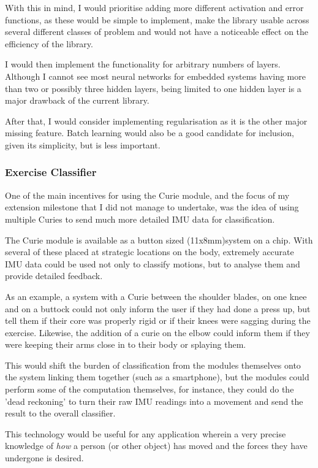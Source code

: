 \documentclass[a4paper]{article}
\begin{document}
With this in mind, I would prioritise adding more different activation and error functions, as these would be simple to implement, make the library usable across several different classes of problem and would not have a noticeable effect on the efficiency of the library.

I would then implement the functionality for arbitrary numbers of layers. Although I cannot see most neural networks for embedded systems having more than two or possibly three hidden layers, being limited to one hidden layer is a major drawback of the current library. 

After that, I would consider implementing regularisation as it is the other major missing feature. Batch learning would also be a good candidate for inclusion, given its simplicity, but is less important.

\subsubsection{Exercise Classifier}

One of the main incentives for using the Curie module, and the focus of my extension milestone that I did not manage to undertake, was the idea of using multiple Curies to send much more detailed IMU data for classification.

The Curie module is available as a button sized (11x8mm)system on a chip.\cite{fwref2} With several of these placed at strategic locations on the body, extremely accurate IMU data could be used not only to classify motions, but to analyse them and provide detailed feedback.

As an example, a system with a Curie between the shoulder blades, on one knee and on a buttock could not only inform the user if they had done a press up, but tell them if their core was properly rigid or if their knees were sagging during the exercise. Likewise, the addition of a curie on the elbow could inform them if they were keeping their arms close in to their body or splaying them.

This would shift the burden of classification from the modules themselves onto the system linking them together (such as a smartphone), but the modules could perform some of the computation themselves, for instance, they could do the 'dead reckoning' to turn their raw IMU readings into a movement and send the result to the overall classifier.

This technology would be useful for any application wherein a very precise knowledge of \textit{how} a person (or other object) has moved and the forces they have undergone is desired.
\end{document}
